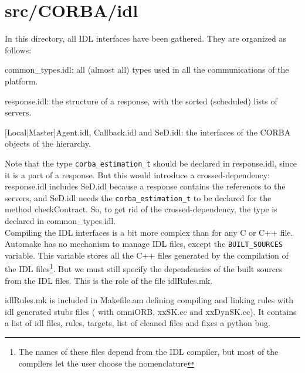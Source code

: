 


  \section{\textsf{src/CORBA/idl}}
  \label{s:IDL}

  In this directory, all IDL interfaces have been gathered. They are organized as
  follows:
  \begin{description}
  \item {\sf common\_types.idl}: all (almost all) types used in all the
  communications of the platform.
  \item {\sf response.idl}: the structure of a response, with the sorted
  (scheduled) lists of servers.
  \item {$[$\textsf{Local$|$Master}$]$\textsf{Agent.idl}, \textsf{Callback.idl} and \textsf{SeD.idl}}: the interfaces of the CORBA objects of the hierarchy.
  \end{description}
  Note that the type \texttt{corba\_estimation\_t} should be declared in
  \textsf{response.idl}, since it is a part of a response. But this would
  introduce a crossed-dependency: \textsf{response.idl} includes \textsf{SeD.idl}
  because a response contains the references to the servers, and \textsf{SeD.idl}
  needs the \texttt{corba\_estimation\_t} to be declared for the method
  \textsf{checkContract}. So, to get rid of the crossed-dependency, the type is
  declared in \textsf{common\_types.idl}.
  \\

  Compiling the IDL interfaces is a bit more complex than for any C or C++ file.
  Automake has no mechanism to manage IDL files, except the
  \texttt{BUILT\_SOURCES} variable. This variable stores all the C++ files
  generated by the compilation of the IDL files\footnote{The names of these files
    depend from the IDL compiler, but most of the compilers let the user choose
      the nomenclature}. But we must still specify the dependencies of the built
      sources from the IDL files. This is the role of the file \textsf{idlRules.mk}.

      \textsf{idlRules.mk} is included in Makefile.am defining compiling and linking rules
      with idl generated stubs files ( with omniORB, xxSK.cc and xxDynSK.cc). It contains
      a list of idl files, rules, targets, list of cleaned files and fixes a python
      bug.



